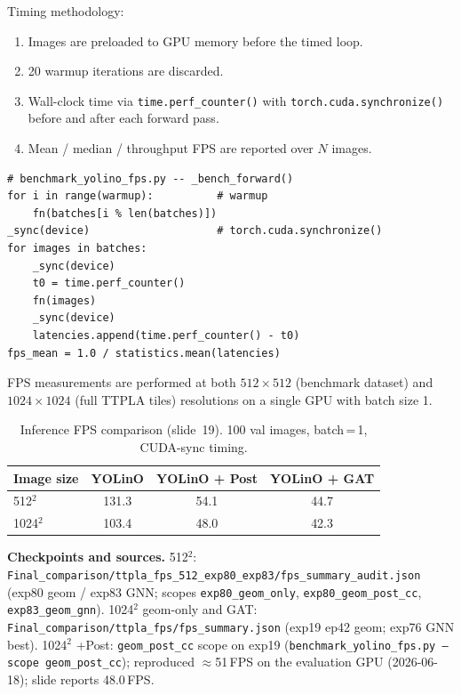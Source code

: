 \documentclass[11pt,a4paper]{article}
\begin{document}
Timing methodology:
\begin{enumerate}[leftmargin=*]
  \item Images are preloaded to GPU memory before the timed loop.
  \item 20 warmup iterations are discarded.
  \item Wall-clock time via \texttt{time.perf\_counter()} with
        \texttt{torch.cuda.synchronize()} before and after each forward pass.
  \item Mean / median / throughput FPS are reported over $N$ images.
\end{enumerate}

\begin{lstlisting}
# benchmark_yolino_fps.py -- _bench_forward()
for i in range(warmup):          # warmup
    fn(batches[i % len(batches)])
_sync(device)                    # torch.cuda.synchronize()
for images in batches:
    _sync(device)
    t0 = time.perf_counter()
    fn(images)
    _sync(device)
    latencies.append(time.perf_counter() - t0)
fps_mean = 1.0 / statistics.mean(latencies)
\end{lstlisting}

FPS measurements are performed at both $512 \times 512$ (benchmark dataset)
and $1024 \times 1024$ (full TTPLA tiles) resolutions on a single GPU
with batch size 1.

\begin{table}[H]
\centering
\caption{Inference FPS comparison (slide~19). 100 val images, batch\,=\,1, CUDA-sync timing.}
\begin{tabular}{lccc}
\toprule
Image size & YOLinO & YOLinO + Post & YOLinO + GAT \\
\midrule
512$^2$  & 131.3 & 54.1 & 44.7 \\
1024$^2$ & 103.4 & 48.0 & 42.3 \\
\bottomrule
\end{tabular}
\end{table}

\noindent
\textbf{Checkpoints and sources.}
512$^2$: \texttt{Final\_comparison/ttpla\_fps\_512\_exp80\_exp83/fps\_summary\_audit.json}
(exp80 geom / exp83 GNN; scopes \texttt{exp80\_geom\_only},
\texttt{exp80\_geom\_post\_cc}, \texttt{exp83\_geom\_gnn}).
1024$^2$ geom-only and GAT: \texttt{Final\_comparison/ttpla\_fps/fps\_summary.json}
(exp19 ep42 geom; exp76 GNN best).
1024$^2$ +Post: \texttt{geom\_post\_cc} scope on exp19
(\texttt{benchmark\_yolino\_fps.py --scope geom\_post\_cc}); reproduced
$\approx$51\,FPS on the evaluation GPU (2026-06-18); slide reports 48.0\,FPS.
\end{document}
